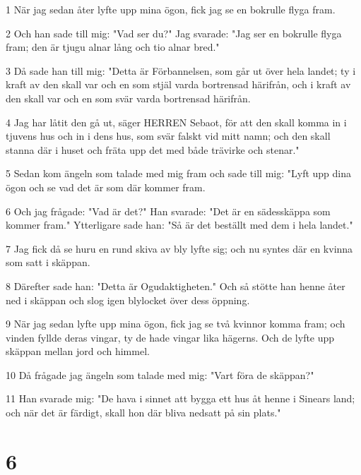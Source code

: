\par 1 När jag sedan åter lyfte upp mina ögon, fick jag se en bokrulle flyga fram.
\par 2 Och han sade till mig: "Vad ser du?" Jag svarade: "Jag ser en bokrulle flyga fram; den är tjugu alnar lång och tio alnar bred."
\par 3 Då sade han till mig: "Detta är Förbannelsen, som går ut över hela landet; ty i kraft av den skall var och en som stjäl varda bortrensad härifrån, och i kraft av den skall var och en som svär varda bortrensad härifrån.
\par 4 Jag har låtit den gå ut, säger HERREN Sebaot, för att den skall komma in i tjuvens hus och in i dens hus, som svär falskt vid mitt namn; och den skall stanna där i huset och fräta upp det med både trävirke och stenar."
\par 5 Sedan kom ängeln som talade med mig fram och sade till mig: "Lyft upp dina ögon och se vad det är som där kommer fram.
\par 6 Och jag frågade: "Vad är det?" Han svarade: "Det är en sädesskäppa som kommer fram." Ytterligare sade han: "Så är det beställt med dem i hela landet."
\par 7 Jag fick då se huru en rund skiva av bly lyfte sig; och nu syntes där en kvinna som satt i skäppan.
\par 8 Därefter sade han: "Detta är Ogudaktigheten." Och så stötte han henne åter ned i skäppan och slog igen blylocket över dess öppning.
\par 9 När jag sedan lyfte upp mina ögon, fick jag se två kvinnor komma fram; och vinden fyllde deras vingar, ty de hade vingar lika hägerns. Och de lyfte upp skäppan mellan jord och himmel.
\par 10 Då frågade jag ängeln som talade med mig: "Vart föra de skäppan?"
\par 11 Han svarade mig: "De hava i sinnet att bygga ett hus åt henne i Sinears land; och när det är färdigt, skall hon där bliva nedsatt på sin plats."

\chapter{6}

